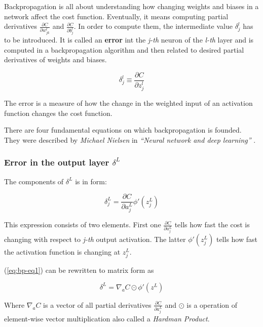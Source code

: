 \vspace{.1cm}

Backpropagation is all about understanding how changing weights and biases in a network affect the cost function. Eventually, it means computing partial derivatives $\frac{\partial C}{\partial w^l_{jk}}$ and $\frac{\partial C}{\partial b^l_j}$. In order to compute them, the intermediate value $\delta^l_j$ has to be introduced. It is called an \textbf{error} int the \emph{j-th} neuron of the \emph{l-th} layer and is computed in a backpropagation algorithm and then related to desired partial derivatives of weights and biases.

\begin{equation}
    \delta^l_j \equiv \frac{\partial C}{\partial z^l_j}
\end{equation}

The error is a measure of how the change in the weighted input of an activation function changes the cost function.

There are four fundamental equations on which backpropagation is founded. They were described by \emph{Michael Nielsen} in \emph{``Neural network and deep learning''} \cite{NNandDL}.

\subsubsection*{Error in the output layer $\delta^L$}
\label{sub2:error-in-the-output-layer}

The components of $\delta^L$ is in form:

\begin{equation}
\delta^L_j = \frac{\partial C}{\partial a^L_j}\phi'(z^L_j)
\tag{EQ1}
\label{eq:bp-eq1}
\end{equation}

This expression consists of two elements. First one $\frac{\partial C}{\partial a^L_j}$ tells how fast the cost is changing with respect to \emph{j-th} output activation. The latter $\phi'(z^L_j)$ tells how fast the activation function is changing at $z^L_j$.

(\ref{eq:bp-eq1}) can be rewritten to matrix form as

\begin{equation}
    \delta^L = \nabla_a C \odot \phi'(z^L)
    \tag{EQ1a}
    \label{eq:bp-eq1a}
\end{equation}

Where $\nabla_a C$ is a vector of all partial derivatives $\frac{\partial C}{\partial a^L_j}$ and $\odot$ is a operation of element-wise vector multiplication also called a \emph{Hardman Product}.

